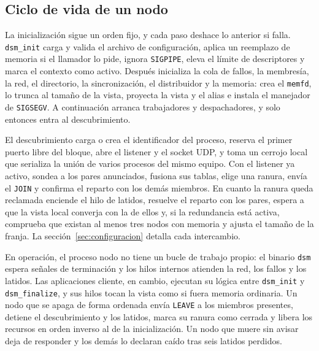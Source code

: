 \subsection{Ciclo de vida de un nodo}

La inicialización sigue un orden fijo, y cada paso deshace lo anterior si falla. \texttt{dsm\_init} carga y valida el archivo de configuración, aplica un reemplazo de memoria si el llamador lo pide, ignora \texttt{SIGPIPE}, eleva el límite de descriptores y marca el contexto como activo. Después inicializa la cola de fallos, la membresía, la red, el directorio, la sincronización, el distribuidor y la memoria: crea el \texttt{memfd}, lo trunca al tamaño de la vista, proyecta la vista y el alias e instala el manejador de \texttt{SIGSEGV}. A continuación arranca trabajadores y despachadores, y solo entonces entra al descubrimiento.

El descubrimiento carga o crea el identificador del proceso, reserva el primer puerto libre del bloque, abre el listener y el socket UDP, y toma un cerrojo local que serializa la unión de varios procesos del mismo equipo. Con el listener ya activo, sondea a los pares anunciados, fusiona sus tablas, elige una ranura, envía el \texttt{JOIN} y confirma el reparto con los demás miembros. En cuanto la ranura queda reclamada enciende el hilo de latidos, resuelve el reparto con los pares, espera a que la vista local converja con la de ellos y, si la redundancia está activa, comprueba que existan al menos tres nodos con memoria y ajusta el tamaño de la franja. La sección~\ref{sec:configuracion} detalla cada intercambio.

En operación, el proceso nodo no tiene un bucle de trabajo propio: el binario \texttt{dsm} espera señales de terminación y los hilos internos atienden la red, los fallos y los latidos. Las aplicaciones cliente, en cambio, ejecutan su lógica entre \texttt{dsm\_init} y \texttt{dsm\_finalize}, y sus hilos tocan la vista como si fuera memoria ordinaria. Un nodo que se apaga de forma ordenada envía \texttt{LEAVE} a los miembros presentes, detiene el descubrimiento y los latidos, marca su ranura como cerrada y libera los recursos en orden inverso al de la inicialización. Un nodo que muere sin avisar deja de responder y los demás lo declaran caído tras seis latidos perdidos.

